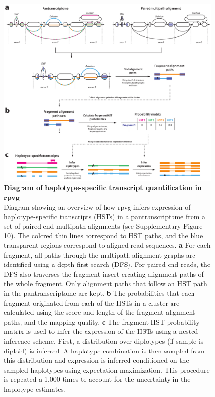 \documentclass[11pt]{ucthesis}
\begin{document}
\begin{figure}[H]
\ssp
\begin{center}
\includegraphics[width=\textwidth]{mpmapfigures/figureS11.pdf}
\caption{\textbf{Diagram of haplotype-specific transcript quantification in rpvg
} \\
Diagram showing an overview of how rpvg infers expression of haplotype-specific transcripts (HSTs) in a pantranscriptome from a set of paired-end multipath alignments (see Supplementary Figure 10). The colored thin lines correspond to HST paths, and the blue transparent regions correspond to aligned read sequences. \textbf{a} For each fragment, all paths through the multipath alignment graphs are identified using a depth-first-search (DFS). For paired-end reads, the DFS also traverses the fragment insert creating alignment paths of the whole fragment. Only alignment paths that follow an HST path in the pantranscriptome are kept. \textbf{b} The probabilities that each fragment originated from each of the HSTs in a cluster are calculated using the score and length of the fragment alignment paths, and the mapping quality. \textbf{c} The fragment-HST probability matrix is used to infer the expression of the HSTs using a nested inference scheme. First, a distribution over diplotypes (if sample is diploid) is inferred. A haplotype combination is then sampled from this distribution and expression is inferred conditioned on the sampled haplotypes using expectation-maximization. This procedure is repeated a 1,000 times to account for the uncertainty in the haplotype estimates.
} \label{fig:hst-quantification}
\end{center}
\end{figure}
\end{document}
